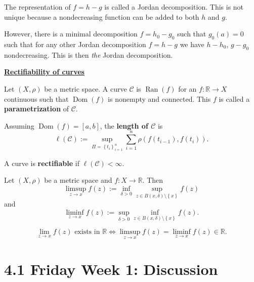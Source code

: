\documentclass{notes}
\begin{document}
  \strut
  
  The representation of $f = h - g$ is called a Jordan decomposition.
  This is not unique because a nondecreasing function can be added to both $h$ and $g$.
  
  However, there is a minimal decomposition $f = h_{0} - g_{0}$ such that $g_0(a) = 0$ such that for any other Jordan decomposition $f = h - g$ we have $h - h_0$, $g - g_0$ nondecreasing.
  This is then \textit{the} Jordan decomposition.
  
  \strut
  
  \underline{{\boldmath \bfseries Rectifiability of curves}}
  
  \begin{defn}
    Let $(X, \rho)$ be a metric space.
    A curve $\mathcal C$ is $\operatorname{Ran}(f)$ for an $f \colon \mathbb R \to X$ continuous such that $\operatorname{Dom}(f)$ is nonempty and connected.
    This $f$ is called a {\boldmath \bfseries parametrization} of $\mathcal C$.
  \end{defn}
  
  \begin{defn}
    Assuming $\operatorname{Dom}(f) = [a, b]$, the {\boldmath \bfseries length of $\mathcal C$} is 
    \[
      \ell(\mathcal C) := \sup_{\Pi = \left \{ t_i \right \}_{i = 1}^n} \sum_{i = 1}^n \rho(f(t_{i - 1}), f(t_i)).
    \]
  \end{defn}
  
  \begin{defn}
    A curve is {\boldmath \bfseries rectifiable} if $\ell(\mathcal C) < \infty$.
  \end{defn}
  
  \begin{defn}
    Let $(X, \rho)$ be a metric space and $f \colon X \to \mathbb R$.
    Then 
    \[
      \limsup_{z \to x} f(z) := \inf_{\delta > 0} \sup_{z \in B(x, \delta) \setminus \left \{ x \right \}} f(z)
    \]
    and 
    \[
      \liminf_{z \to x} f(z) := \sup_{\delta > 0} \inf_{z \in B(x, \delta) \setminus \left \{ x \right \}} f(z).
    \]
  \end{defn}
  
  \begin{lem}
    \[
      \lim_{z \to x} f(z) \text{ exists in $\mathbb R$} \Leftrightarrow \limsup_{z \to x} f(z) = \liminf_{z \to x} f(z) \in \mathbb R.
    \]
  \end{lem}
  
  \newpage
  
  \section{4.1 Friday Week 1: Discussion}
  
\end{document}
